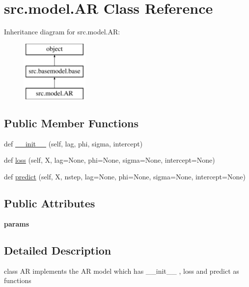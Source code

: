 \hypertarget{classsrc_1_1model_1_1AR}{}\section{src.\+model.\+AR Class Reference}
\label{classsrc_1_1model_1_1AR}
Inheritance diagram for src.\+model.\+AR\+:\begin{figure}[H]
\begin{center}
\leavevmode
\includegraphics[height=3.000000cm]{classsrc_1_1model_1_1AR}
\end{center}
\end{figure}
\subsection*{Public Member Functions}
\begin{DoxyCompactItemize}
\item 
def \hyperlink{classsrc_1_1model_1_1AR_a943f799da7cba763b29778ba12481c64}{\+\_\+\+\_\+init\+\_\+\+\_\+} (self, lag, phi, sigma, intercept)
\item 
def \hyperlink{classsrc_1_1model_1_1AR_ae6095b1c295bdbd6dddd0b1fa87948ef}{loss} (self, X, lag=None, phi=None, sigma=None, intercept=None)
\item 
def \hyperlink{classsrc_1_1model_1_1AR_a2a2f41f1e5cfb10f0c5680ea689e1994}{predict} (self, X, nstep, lag=None, phi=None, sigma=None, intercept=None)
\end{DoxyCompactItemize}
\subsection*{Public Attributes}
\begin{DoxyCompactItemize}
\item 
\mbox{\label{classsrc_1_1model_1_1AR_a4ba754929f5fa9b24a5b6653d7b62411}} 
{\bfseries params}
\end{DoxyCompactItemize}


\subsection{Detailed Description}
\begin{DoxyVerb}class AR implements the AR model which has __init__ , loss and predict as functions\end{DoxyVerb}
 

